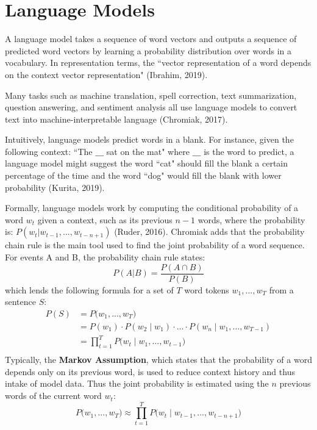 \section{Language Models} \label{LanguageModels}

A language model takes a sequence of word vectors and outputs a sequence of predicted word vectors by learning a probability distribution over words in a vocabulary. In representation terms, the ``vector representation of a word depends on the context vector representation" (Ibrahim, 2019).

Many tasks such as machine translation, spell correction, text summarization, question answering, and sentiment analysis all use language models to convert text into machine-interpretable language (Chromiak, 2017). 

Intuitively, language models predict words in a blank. For instance, given the following context: ``The $\_\_\_$ sat on the mat" where $\_\_\_$ is the word to predict, a language model might suggest the word ``cat" should fill the blank a certain percentage of the time and the word ``dog" would fill the blank with lower probability (Kurita, 2019). 

Formally, language models work by computing the conditional probability of a word $w_t$ given a context, such as its previous $n-1$ words, where the probability is: $P(w_t | w_{t-1}, ..., w_{t-n+1})$ (Ruder, 2016). Chromiak adds that the probability chain rule is the main tool used to find the joint probability of a word sequence. For events A and B, the probability chain rule states:
$$
P(A | B) = \frac{P(A \cap B)} {P(B)}
$$
which lends the following formula for a set of $T$ word tokens $w_1, ..., w_T$ from a sentence $S$: 
$$
\begin{array}{ll}
P(S)
&= P \Big(w_1, ..., w_T \Big)  \\
&= P(w_1) \cdot P(w_2 \; | \; w_1) \cdot ... \cdot P(w_n \; | \; w_1, ..., w_{T-1}) \\
&= \prod_{t=1}^T P \Big(w_t \; | \; w_1, ..., w_{t-1} \Big) \\
\end{array}
$$
Typically, the \textbf{Markov Assumption}, which states that the probability of a word depends only on its previous word, is used to reduce context history and thus intake of model data. Thus the joint probability is estimated using the $n$ previous words of the current word $w_t$:
$$
P \Big(w_1, ..., w_T \Big) \approx \prod_{t=1}^T P \Big(w_t \; | \; w_{t-1}, ..., w_{t-n+1} \Big)
$$

